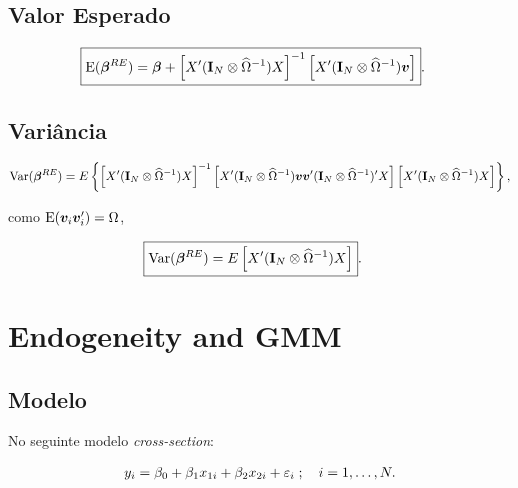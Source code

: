\documentclass[11pt, oneside, a4paper, article]{article}
\numberwithin{equation}{section}
\begin{document}
\begin{description}
\subsection{Valor Esperado}

\vspace{-1 em}
\begin{align*}
	\Aboxed{
\E( \betavec^{RE} ) = 
\betavec +
\left[ X' (\Imat_{N} \otimes \widehat{\Omega}^{-1}) X \right]^{-1}
\left[ X' (\Imat_{N} \otimes \widehat{\Omega}^{-1}) \mbs{v} \right] }.
\end{align*}

\subsection{Variância}

\vspace{-1 em}
\begin{align*} 
\text{Var}( \boldsymbol{\beta}^{RE} ) = 
E
\left\{ 
\left[ X' ( \mathbf{I}_{N} \otimes \widehat{\Omega}^{-1} ) X \right]^{-1}
\left[
X' ( \mathbf{I}_{N} \otimes \widehat{\Omega}^{-1} )
\boldsymbol{v} \boldsymbol{v}'
( \mathbf{I}_{N} \otimes \widehat{\Omega}^{-1} )' X
\right]
\left[ X' ( \mathbf{I}_{N} \otimes \widehat{\Omega}^{-1} ) X \right]
\right\},
\end{align*}

\noindent
como $\text{E}( \boldsymbol{v}_{i} \boldsymbol{v}_{i}' ) =\Omega$,

\vspace{-1 em}
\begin{align*} 
	\Aboxed{
\Var( \betavec^{RE} ) = 
E
\left[ X' ( \Imat_{N} \otimes \widehat{\Omega}^{-1} ) X \right] }.
\end{align*}



\clearpage
\section{Endogeneity and GMM}


\subsection{Modelo}

No seguinte modelo \textit{cross-section}:

\vspace{-1 em}
\begin{align} \label{mod1}
	y_{i} = \beta_{0} + \beta_{1} x_{1i} + \beta_{2} x_{2i} + \varepsilon_{i}
	\; ; \quad i = 1, \dots, N.
\end{align}


\end{description}
\end{document}
